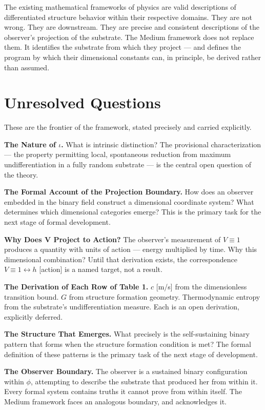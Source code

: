 \documentclass[12pt, letterpaper]{article}
\begin{document}
The existing mathematical frameworks of physics are valid descriptions of
differentiated structure behavior within their respective domains. They are not
wrong. They are downstream. They are precise and consistent descriptions of the
observer's projection of the substrate. The Medium framework does not replace
them. It identifies the substrate from which they project --- and defines the
program by which their dimensional constants can, in principle, be derived rather
than assumed.
\section{Unresolved Questions}
\label{sec:org669096d}

These are the frontier of the framework, stated precisely and carried explicitly.

\textbf{The Nature of \(\iota\).} What is intrinsic distinction? The provisional
characterization --- the property permitting local, spontaneous reduction from
maximum undifferentiation in a fully random substrate --- is the central open
question of the theory.

\textbf{The Formal Account of the Projection Boundary.} How does an observer embedded
in the binary field construct a dimensional coordinate system? What determines
which dimensional categories emerge? This is the primary task for the next stage
of formal development.

\textbf{Why Does V Project to Action?} The observer's measurement of \(V \equiv 1\)
produces a quantity with units of action --- energy multiplied by time. Why this
dimensional combination? Until that derivation exists, the correspondence
\(V \equiv 1 \leftrightarrow h\) {[}action] is a named target, not a result.

\textbf{The Derivation of Each Row of Table 1.} \(c\) {[}m/s] from the dimensionless
transition bound. \(G\) from structure formation geometry. Thermodynamic entropy
from the substrate's undifferentiation measure. Each is an open derivation,
explicitly deferred.

\textbf{The Structure That Emerges.} What precisely is the self-sustaining binary
pattern that forms when the structure formation condition is met? The formal
definition of these patterns is the primary task of the next stage of
development.

\textbf{The Observer Boundary.} The observer is a sustained binary configuration within
\(\phi\), attempting to describe the substrate that produced her from within it.
Every formal system contains truths it cannot prove from within itself. The
Medium framework faces an analogous boundary, and acknowledges it.
\end{document}
